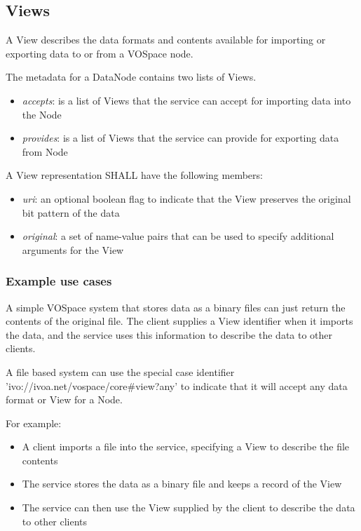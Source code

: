 \documentclass[11pt,a4paper]{ivoa}
\begin{document}
\subsection{Views}
A View describes the data formats and contents available for importing or exporting data to or from a VOSpace node.

The metadata for a DataNode contains two lists of Views.

\begin{itemize}
    \item \emph{accepts}: is a list of Views that the service can accept for importing data into the Node
    \item \emph{provides}: is a list of Views that the service can provide for exporting data from Node
\end{itemize}

A View representation SHALL have the following members:

\begin{itemize}
    \item \emph{uri}: an optional boolean flag to indicate that the View preserves the original bit pattern of the data
    \item \emph{original}: a set of name-value pairs that can be used to specify additional arguments for the View
\end{itemize}

\subsubsection{Example use cases}
A simple VOSpace system that stores data as a binary files can just return the contents of the original file. The client supplies a View identifier when it imports the data, and the service uses this information to describe the data to other clients.

A file based system can use the special case identifier 'ivo://ivoa.net/vospace/core\#view?any' to indicate that it will accept any data format or View for a Node.

For example:

\begin{itemize}
    \item A client imports a file into the service, specifying a View to describe the file contents
    \item The service stores the data as a binary file and keeps a record of the View
    \item The service can then use the View supplied by the client to describe the data to other clients
\end{itemize}
\end{document}
